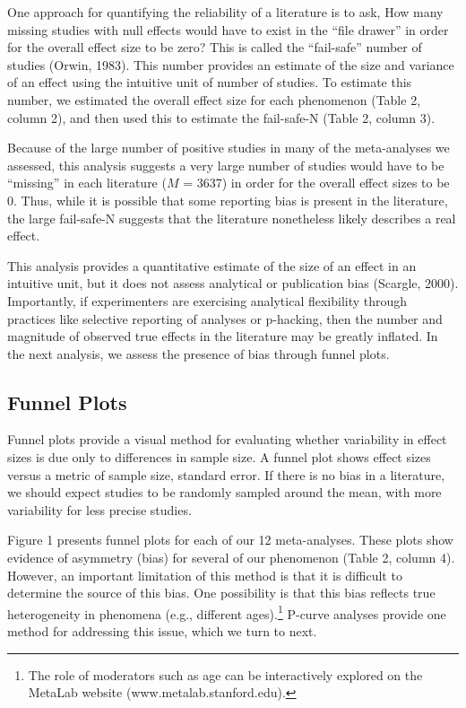 \documentclass[english,floatsintext,man]{apa6}
\begin{document}
One approach for quantifying the reliability of a literature is to ask,
How many missing studies with null effects would have to exist in the
\enquote{file drawer} in order for the overall effect size to be zero?
This is called the \enquote{fail-safe} number of studies (Orwin, 1983).
This number provides an estimate of the size and variance of an effect
using the intuitive unit of number of studies. To estimate this number,
we estimated the overall effect size for each phenomenon (Table 2,
column 2), and then used this to estimate the fail-safe-N (Table 2,
column 3).

Because of the large number of positive studies in many of the
meta-analyses we assessed, this analysis suggests a very large number of
studies would have to be \enquote{missing} in each literature (\(M\) =
3637) in order for the overall effect sizes to be 0. Thus, while it is
possible that some reporting bias is present in the literature, the
large fail-safe-N suggests that the literature nonetheless likely
describes a real effect.

This analysis provides a quantitative estimate of the size of an effect
in an intuitive unit, but it does not assess analytical or publication
bias (Scargle, 2000). Importantly, if experimenters are exercising
analytical flexibility through practices like selective reporting of
analyses or p-hacking, then the number and magnitude of observed true
effects in the literature may be greatly inflated. In the next analysis,
we assess the presence of bias through funnel plots.

\subsection{Funnel Plots}\label{funnel-plots}

Funnel plots provide a visual method for evaluating whether variability
in effect sizes is due only to differences in sample size. A funnel plot
shows effect sizes versus a metric of sample size, standard error. If
there is no bias in a literature, we should expect studies to be
randomly sampled around the mean, with more variability for less precise
studies.

Figure 1 presents funnel plots for each of our 12 meta-analyses. These
plots show evidence of asymmetry (bias) for several of our phenomenon
(Table 2, column 4). However, an important limitation of this method is
that it is difficult to determine the source of this bias. One
possibility is that this bias reflects true heterogeneity in phenomena
(e.g., different
ages).\footnote{The role of moderators such as age can be interactively explored on the MetaLab website (www.metalab.stanford.edu).}
P-curve analyses provide one method for addressing this issue, which we
turn to next.
\end{document}
